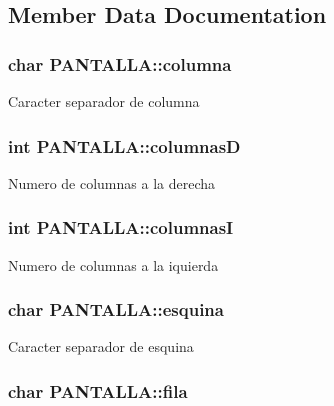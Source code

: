 \subsection{Member Data Documentation}
\hypertarget{structPANTALLA_ad8dd2cd0946ef322134cb764c429f65f}{
\subsubsection[{columna}]{\setlength{\rightskip}{0pt plus 5cm}char {\bf PANTALLA::columna}}}
\label{structPANTALLA_ad8dd2cd0946ef322134cb764c429f65f}
Caracter separador de columna \hypertarget{structPANTALLA_a56ca91dd3cbe1365864d4a6fda66bbb5}{
\subsubsection[{columnasD}]{\setlength{\rightskip}{0pt plus 5cm}int {\bf PANTALLA::columnasD}}}
\label{structPANTALLA_a56ca91dd3cbe1365864d4a6fda66bbb5}
Numero de columnas a la derecha \hypertarget{structPANTALLA_af35fa7c9120679d5ede24491d93a07c0}{
\subsubsection[{columnasI}]{\setlength{\rightskip}{0pt plus 5cm}int {\bf PANTALLA::columnasI}}}
\label{structPANTALLA_af35fa7c9120679d5ede24491d93a07c0}
Numero de columnas a la iquierda \hypertarget{structPANTALLA_aa258b985a8d4e573fa0ac7406cda3742}{
\subsubsection[{esquina}]{\setlength{\rightskip}{0pt plus 5cm}char {\bf PANTALLA::esquina}}}
\label{structPANTALLA_aa258b985a8d4e573fa0ac7406cda3742}
Caracter separador de esquina \hypertarget{structPANTALLA_aa48180c68b4bae25a55f5ee460e3fd33}{
\subsubsection[{fila}]{\setlength{\rightskip}{0pt plus 5cm}char {\bf PANTALLA::fila}}}
